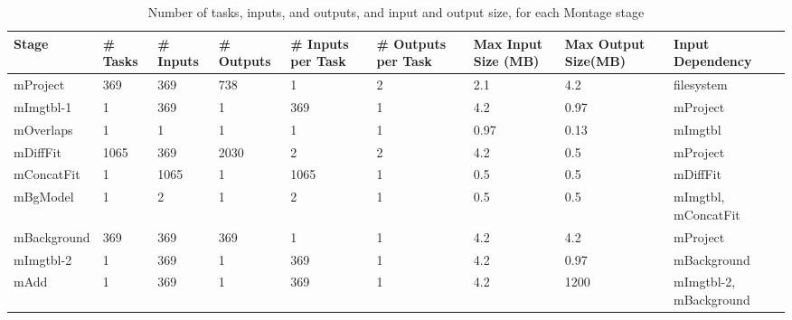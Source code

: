 \documentclass{sig-alternate}
\begin{document}
\begin{table}[ht]
\begin{center}
    \caption{Number of tasks, inputs, and outputs, and input and output size, for each Montage stage}
    \begin{scriptsize}
    \begin{tabular}{ | p{1.6cm} | p{0.8cm} | p{0.8cm} | p{1.2cm} | p{1cm} | p{1.1cm} | p{1.1cm} | p{1.2cm} | p{2.7cm} |}
    \hline
    Stage & \# Tasks & \# Inputs & \# Outputs & \# Inputs per Task & \# Outputs per Task & Max Input Size (MB) & Max Output Size(MB) & Input Dependency\\ \hline \hline
	mProject & 369 & 369 & 738 & 1 & 2 & 2.1 & 4.2 & filesystem \\ \hline
	mImgtbl-1 & 1 & 369 & 1 & 369 & 1 & 4.2 & 0.97 & mProject\\ \hline
	mOverlaps & 1 & 1 & 1 & 1 & 1 & 0.97 & 0.13 & mImgtbl\\ \hline
	mDiffFit & 1065 & 369 & 2030 & 2 & 2 & 4.2 & 0.5 & mProject\\ \hline
	mConcatFit & 1 & 1065 & 1 & 1065 & 1 & 0.5 & 0.5 & mDiffFit\\ \hline
	mBgModel & 1 & 2 & 1 & 2 & 1 & 0.5 & 0.5 & mImgtbl, mConcatFit\\ \hline
	mBackground & 369 & 369 & 369 & 1 & 1 & 4.2 & 4.2 & mProject\\ \hline
	mImgtbl-2 & 1 & 369 & 1 & 369 & 1 & 4.2 & 0.97 & mBackground\\ \hline
	mAdd  & 1 & 369 & 1 & 369 & 1 & 4.2 & 1200 & mImgtbl-2, mBackground\\ \hline
    \end{tabular}
    \end{scriptsize}
    \label{tb:montage-stats}
\end{center}   
\end{table} 
\end{document}
